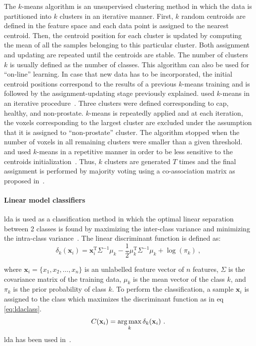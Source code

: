 The $k$-means algorithm is an unsupervised clustering method in which the data is partitioned into $k$ clusters in an iterative manner.
First, $k$ random centroids are defined in the feature space and each data point is assigned to the nearest centroid.
Then, the centroid position for each cluster is updated by computing the mean of all the samples belonging to this particular cluster.
Both assignment and updating are repeated until the centroids are stable.
The number of clusters $k$ is usually defined as the number of classes.
This algorithm can also be used for ``on-line'' learning.
In case that new data has to be incorporated, the initial centroid positions correspond to the results of a previous $k$-means training and is followed by the assignment-updating stage previously explained.
\citeauthor{Tiwari2009} used $k$-means in an iterative procedure~\cite{Tiwari2007,Tiwari2009}.
Three clusters were defined corresponding to \ac{cap}, healthy, and non-prostate.
$k$-means is repeatedly applied and at each iteration, the voxels corresponding to the largest cluster are excluded under the assumption that it is assigned to ``non-prostate'' cluster.
The algorithm stopped when the number of voxels in all remaining clusters were smaller than a given threshold.
\citeauthor{Tiwari2008} and \citeauthor{Viswanath2008a} used $k$-means in a repetitive manner in order to be less sensitive to the centroids initialization~\cite{Viswanath2008,Viswanath2008a,Tiwari2008}.
Thus, $k$ clusters are generated $T$ times and the final assignment is performed by majority voting using a co-association matrix as proposed in~\cite{Fred2005}.

\paragraph{Linear model classifiers}
\Acf{lda} is used as a classification method in which the optimal linear separation between 2 classes is found by maximizing the inter-class variance and minimizing the intra-class variance~\cite{Friedman1989}.
The linear discriminant function is defined as:
\begin{equation}
	\delta_{k}(\mathbf{x}_i) = \mathbf{x}_i^{\text{T}} \Sigma^{-1} \mu_k - \frac{1}{2} \mu_{k}^{\text{T}} \Sigma^{-1} \mu_k + \log (\pi_k) \ ,
	\label{eq:ldafun}
\end{equation}

\noindent where $\mathbf{x}_i = \{x_1, x_2, \dots , x_n\}$ is an unlabelled feature vector of $n$ features, $\Sigma$ is the covariance matrix of the training data, $\mu_k$ is the mean vector of the class $k$, and $\pi_k$ is the prior probability of class $k$.
To perform the classification, a sample $\mathbf{x}_i$ is assigned to the class which maximizes the discriminant function as in \acs{eq}\,\eqref{eq:ldaclass}.
\begin{equation}
	C(\mathbf{x}_i) = \operatorname*{arg\,max}_k \delta_k(\mathbf{x}_i) \ .
	\label{eq:ldaclass}
\end{equation}
\Ac{lda} has been used in~\cite{Antic2013,Chan2003,Niaf2011,Niaf2012,Vos2012}.


